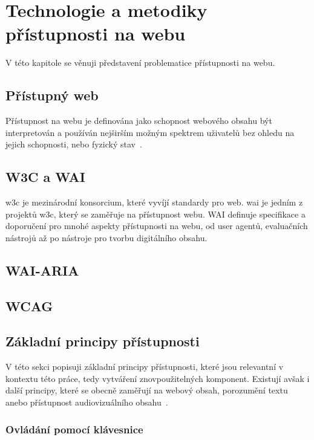 \chapter{Technologie a metodiky přístupnosti na webu}

V této kapitole se věnuji představení problematice přístupnosti na webu.

\section{Přístupný web}

Přístupnost na webu je definována jako schopnost webového obsahu být interpretován a používán nejširším možným spektrem uživatelů bez ohledu na jejich schopnosti, nebo fyzický stav~\cite{w3-accessibility}.

\section{W3C a WAI}


\gls{w3c} je mezinárodní konsorcium, které vyvíjí standardy pro web.
\gls{wai} je jedním z projektů \gls{w3c}, který se zaměřuje na přístupnost webu.
WAI definuje specifikace a doporučení pro mnohé aspekty přístupnosti na webu, od user agentů, evaluačních nástrojů až po nástroje pro tvorbu digitálního obsahu.

\section{WAI-ARIA}

\section{WCAG}

\section{Základní principy přístupnosti}

V této sekci popisuji základní principy přístupnosti, které jsou relevantní v kontextu této práce, tedy vytváření znovpoužitelných komponent.
Existují avšak i další principy, které se obecně zaměřují na webový obsah, porozumění textu anebo přístupnost audiovizuálního obsahu~\cite{w3-accessibility-principles}.

\subsection{Ovládání pomocí klávesnice}

